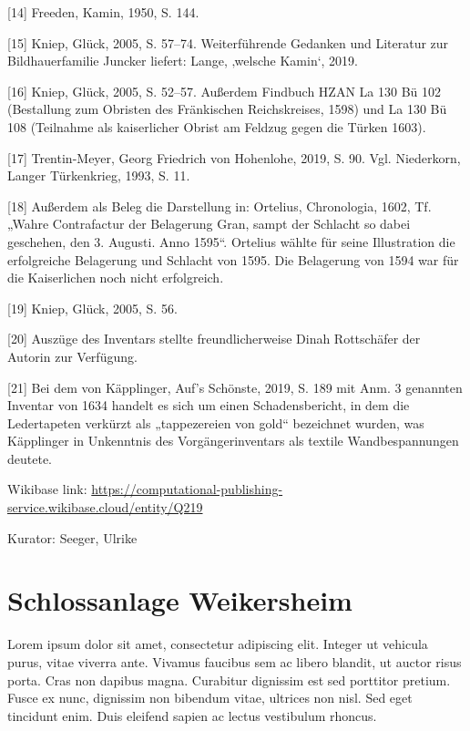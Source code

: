 \documentclass[
  letterpaper,
]{book}
\begin{document}
{[}14{]} Freeden, Kamin, 1950, S. 144.

{[}15{]} Kniep, Glück, 2005, S. 57--74. Weiterführende Gedanken und
Literatur zur Bildhauerfamilie Juncker liefert: Lange, ‚welsche Kamin`,
2019.

{[}16{]} Kniep, Glück, 2005, S. 52--57. Außerdem Findbuch HZAN La 130 Bü
102 (Bestallung zum Obristen des Fränkischen Reichskreises, 1598) und La
130 Bü 108 (Teilnahme als kaiserlicher Obrist am Feldzug gegen die
Türken 1603).

{[}17{]} Trentin-Meyer, Georg Friedrich von Hohenlohe, 2019, S. 90. Vgl.
Niederkorn, Langer Türkenkrieg, 1993, S. 11.

{[}18{]} Außerdem als Beleg die Darstellung in: Ortelius, Chronologia,
1602, Tf. „Wahre Contrafactur der Belagerung Gran, sampt der Schlacht so
dabei geschehen, den 3. Augusti. Anno 1595``. Ortelius wählte für seine
Illustration die erfolgreiche Belagerung und Schlacht von 1595. Die
Belagerung von 1594 war für die Kaiserlichen noch nicht erfolgreich.

{[}19{]} Kniep, Glück, 2005, S. 56.

{[}20{]} Auszüge des Inventars stellte freundlicherweise Dinah
Rottschäfer der Autorin zur Verfügung.

{[}21{]} Bei dem von Käpplinger, Auf's Schönste, 2019, S. 189 mit Anm. 3
genannten Inventar von 1634 handelt es sich um einen Schadensbericht, in
dem die Ledertapeten verkürzt als „tappezereien von gold`` bezeichnet
wurden, was Käpplinger in Unkenntnis des Vorgängerinventars als textile
Wandbespannungen deutete.

Wikibase link:
\url{https://computational-publishing-service.wikibase.cloud/entity/Q219}

Kurator: Seeger, Ulrike


\chapter{Schlossanlage Weikersheim}\label{schlossanlage-weikersheim}

Lorem ipsum dolor sit amet, consectetur adipiscing elit. Integer ut
vehicula purus, vitae viverra ante. Vivamus faucibus sem ac libero
blandit, ut auctor risus porta. Cras non dapibus magna. Curabitur
dignissim est sed porttitor pretium. Fusce ex nunc, dignissim non
bibendum vitae, ultrices non nisl. Sed eget tincidunt enim. Duis
eleifend sapien ac lectus vestibulum rhoncus.
\end{document}
